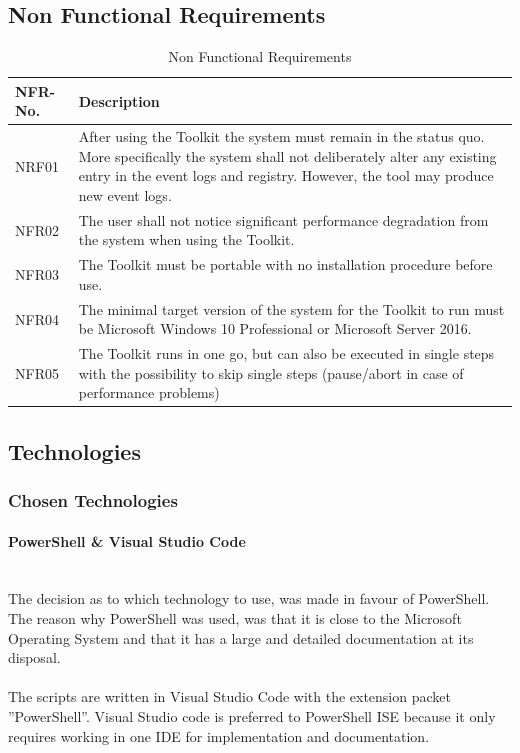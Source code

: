 \subsection{Non Functional Requirements}

\begin{table}[H]
    \centering
    \def\arraystretch{2}
    \begin{tabular}{| p{2.5cm} | p{13.5cm} |} \hline
        \textbf{NFR-No.} & \textbf{Description}  \\ \hline
        NRF01 & After using the Toolkit the system must remain in the status quo. More specifically the system shall not deliberately alter any existing entry in the event logs and registry. However, the tool may produce new event logs.\\ \hline
        NFR02 & The user shall not notice significant performance degradation from the system when using the Toolkit. \\ \hline
        NFR03 & The Toolkit must be portable with no installation procedure before use. \\ \hline
        NFR04 & The minimal target version of the system for the Toolkit to run must be Microsoft Windows 10 Professional or Microsoft Server 2016. \\ \hline
        NFR05 & The Toolkit runs in one go, but can also be executed in single steps with the possibility to skip single steps (pause/abort in case of performance problems) \\ \hline
    \end{tabular}
    \caption{Non Functional Requirements}
\end{table}

\clearpage

\subsection{Technologies}
\subsubsection{Chosen Technologies}
\paragraph{PowerShell \& Visual Studio Code} \ \\
The decision as to which technology to use, was made in favour of PowerShell. The reason why PowerShell was used, was that it is close to the Microsoft Operating System and that it has a large and detailed documentation at its disposal. \ \\
\ \\
The scripts are written in Visual Studio Code with the extension packet ''PowerShell''. Visual Studio code is preferred to PowerShell ISE because it only requires working in one IDE for implementation and documentation.

